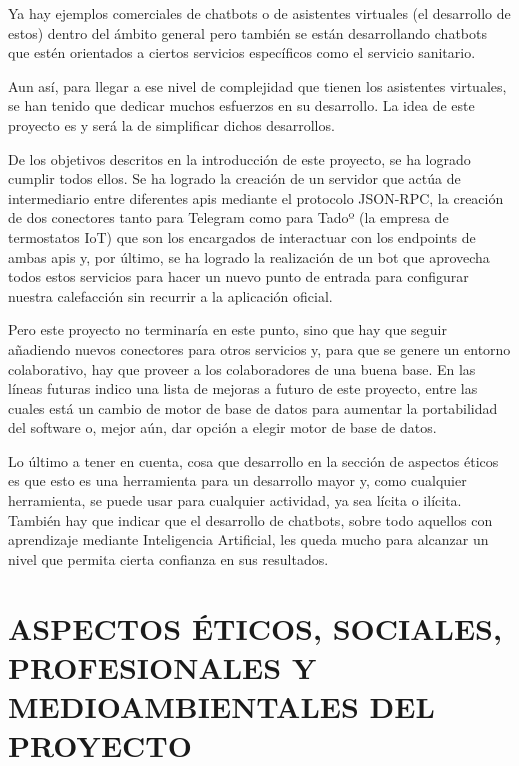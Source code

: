\documentclass[spanish,12pt, a4paper, twoside]{paper}
\let\oldsection\section
\def\section{\cleardoublepage\oldsection}
\begin{document}
Ya hay ejemplos comerciales de chatbots o de asistentes virtuales (el desarrollo de estos) dentro del ámbito general pero también se están desarrollando chatbots que estén orientados a ciertos servicios específicos como el servicio sanitario.
\newline

Aun así, para llegar a ese nivel de complejidad que tienen los asistentes virtuales, se han tenido que dedicar muchos esfuerzos en su desarrollo. La idea de este proyecto es y será la de simplificar dichos desarrollos.
\newline

De los objetivos descritos en la introducción de este proyecto, se ha logrado cumplir todos ellos. Se ha logrado la creación de un servidor que actúa de intermediario entre diferentes apis mediante el protocolo JSON-RPC, la creación de dos conectores tanto para Telegram como para Tadoº (la empresa de termostatos IoT) que son los encargados de interactuar con los endpoints de ambas apis y, por último, se ha logrado la realización de un bot que aprovecha todos estos servicios para hacer un nuevo punto de entrada para configurar nuestra calefacción sin recurrir a la aplicación oficial.
\newline

Pero este proyecto no terminaría en este punto, sino que hay que seguir añadiendo nuevos conectores para otros servicios y, para que se genere un entorno colaborativo, hay que proveer a los colaboradores de una buena base. En las líneas futuras indico una lista de mejoras a futuro de este proyecto, entre las cuales está un cambio de motor de base de datos para aumentar la portabilidad del software o, mejor aún, dar opción a elegir motor de base de datos.
\newline

Lo último a tener en cuenta, cosa que desarrollo en la sección de aspectos éticos es que esto es una herramienta para un desarrollo mayor y, como cualquier herramienta, se puede usar para cualquier actividad, ya sea lícita o ilícita. También hay que indicar que el desarrollo de chatbots, sobre todo aquellos con aprendizaje mediante Inteligencia Artificial, les queda mucho para alcanzar un nivel que permita cierta confianza en sus resultados.

\section{ASPECTOS ÉTICOS, SOCIALES, PROFESIONALES Y MEDIOAMBIENTALES DEL PROYECTO}
\end{document}

